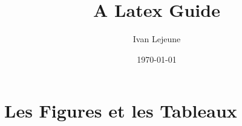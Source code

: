 \documentclass[french,a4paper,10pt]{article}
\title{\color{astral} \sffamily \bfseries A Latex Guide}
\author{Ivan Lejeune}
\date{\today}
\begin{document}
    
    \newpage

    \tableofcontents\label{toc}
    \newpage

    
    \newpage

    
    \newpage

    
    \newpage

    
    \newpage

    \section{Les Figures et les Tableaux}\label{sec:figures}
    
    \newpage

\end{document}
